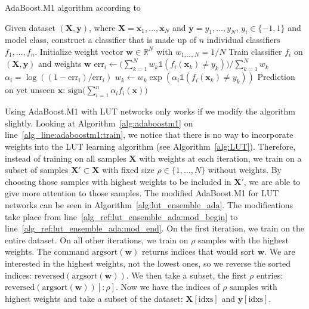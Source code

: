 \begin{algorithm}
  \caption{AdaBoost.M1 algorithm according to \cite{bib:adaboostm1}} \label{alg:adaboostm1}
  \begin{algorithmic}[1]
    \State Given dataset $(\bm{X}, \bm{y})$, where $\bm{X} = \bm{x}_1, \dots, \bm{x}_N$ and $\bm{y} = y_1, \dots, y_N$, $y_i \in \{-1, 1\}$ and model class, construct a classifier that is made up of $n$ individual classifiers $f_1, \dots, f_n$.
    \vspace{1em}
    \State Initialize weight vector $\bm{w} \in \mathds{R}^N$ with $w_{1, \dots, N} = 1/N$
    \vspace{0.5em}
    \State Train classifier $f_i$ on $(\bm{X},\bm{y})$ and weights $\bm{w}$ \label{alg_line:adaboostm1:train}
    \State $\text{err}_i \gets \big( \sum_{k=1}^N w_k \mathbb{1}(f_i(\bm{x}_k) \neq y_k) \big) / \sum_{k=1}^N w_k$
    \State $\alpha_i = \log((1 - \text{err}_i) / \text{err}_i)$
    \State $w_k \gets w_k \exp(\alpha_i \mathbb{1}(f_i(\bm{x}_k) \neq y_k))$
    \EndFor
    \EndFor
    \State Prediction on yet unseen $\bm{x}$: $\text{sign} \big( \sum_{i = 1}^n \alpha_i f_i(\bm{x}) \big)$
  \end{algorithmic}
\end{algorithm}
\FloatBarrier

\noindent Using AdaBoost.M1 with LUT networks only works if we modify the algorithm slightly. Looking at Algorithm~\ref{alg:adaboostm1} on line~\ref{alg_line:adaboostm1:train}, we notice that there is no way to incorporate weights into the LUT learning algorithm (see Algorithm~\ref{alg:LUT}). Therefore, instead of training on all samples $\bm{X}$ with weights at each iteration, we train on a subset of samples $\bm{X}' \subset \bm{X}$ with fixed size $\rho \in \{1, \dots, N\}$ without weights. By choosing those samples with highest weights to be included in $\bm{X}'$, we are able to give more attention to those samples. The modified AdaBoost.M1 for LUT networks can be seen in Algorithm~\ref{alg:lut_ensemble_ada}. The modifications take place from line~\ref{alg_ref:lut_ensemble_ada:mod_begin} to line~\ref{alg_ref:lut_ensemble_ada:mod_end}. On the first iteration, we train on the entire dataset. On all other iterations, we train on $\rho$ samples with the highest weights. The command $\text{argsort}(\bm{w})$ returns indices that would sort $\bm{w}$. We are interested in the highest weights, not the lowest ones, so we reverse the sorted indices: $\text{reversed}(\text{argsort}(\bm{w}))$. We then take a subset, the first $\rho$ entries: $\text{reversed}(\text{argsort}(\bm{w}))[:\rho]$. Now we have the indices of $\rho$ samples with highest weights and take a subset of the dataset: $\bm{X}[\text{idxs}]$ and $\bm{y}[\text{idxs}]$.

